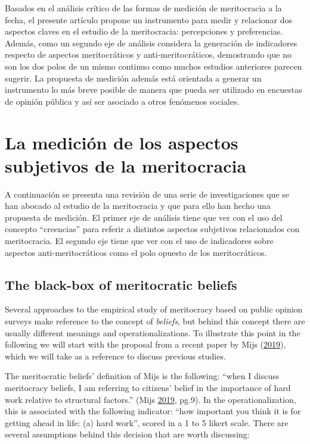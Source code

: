 \documentclass[
]{article}
\begin{document}
Basados en el análisis crítico de las formas de medición de meritocracia a la fecha, el presente artículo propone un instrumento para medir y relacionar dos aspectos claves en el estudio de la meritocracia: percepciones y preferencias. Además, como un segundo eje de análisis considera la generación de indicadores respecto de aspectos meritocráticos y anti-meritocráticos, demostrando que no son los dos polos de un mismo continuo como muchos estudios anteriores parecen sugerir. La propuesta de medición además está orientada a generar un instrumento lo más breve posible de manera que pueda ser utilizado en encuestas de opinión pública y así ser asociado a otros fenómenos sociales.

\hypertarget{la-mediciuxf3n-de-los-aspectos-subjetivos-de-la-meritocracia}{%
\section{La medición de los aspectos subjetivos de la meritocracia}\label{la-mediciuxf3n-de-los-aspectos-subjetivos-de-la-meritocracia}}

A continuación se presenta una revisión de una serie de investigaciones que se han abocado al estudio de la meritocracia y que para ello han hecho una propuesta de medición. El primer eje de análisis tiene que ver con el uso del concepto ``creencias'' para referir a distintos aspectos subjetivos relacionados con meritocracia. El segundo eje tiene que ver con el uso de indicadores sobre aspectos anti-meritocráticos como el polo opuesto de los meritocráticos.

\hypertarget{blackbox}{%
\subsection*{The black-box of meritocratic beliefs}\label{blackbox}}

Several approaches to the empirical study of meritocracy based on public opinion surveys make reference to the concept of \emph{beliefs}, but behind this concept there are usually different meanings and operationalizations. To illustrate this point in the following we will start with the proposal from a recent paper by Mijs (\protect\hyperlink{ref-mijs_paradox_2019}{2019}), which we will take as a reference to discuss previous studies.

The meritocratic beliefs' definition of Mijs is the following: ``when I discuss meritocracy beliefs, I am referring to citizens' belief in the importance of hard work relative to structural factors.'' (Mijs \protect\hyperlink{ref-mijs_paradox_2019}{2019}, pg.9). In the operationalization, this is associated with the following indicator: ``how important you think it is for getting ahead in life: (a) hard work'', scored in a 1 to 5 likert scale. There are several assumptions behind this decision that are worth discussing:
\end{document}
